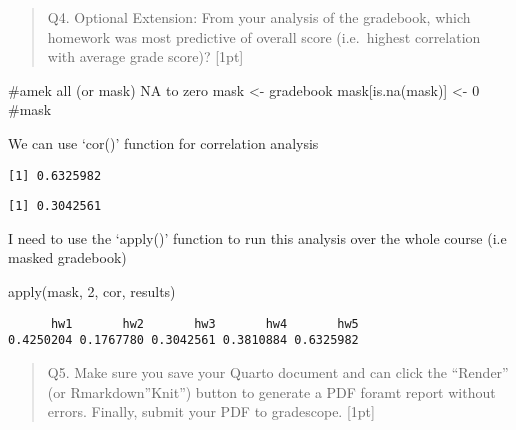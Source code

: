 \documentclass[
  letterpaper,
  DIV=11,
  numbers=noendperiod]{scrartcl}
\newenvironment{Shaded}{\begin{snugshade}}{\end{snugshade}}
\newcommand{\CommentTok}[1]{\textcolor[rgb]{0.37,0.37,0.37}{#1}}
\newcommand{\DecValTok}[1]{\textcolor[rgb]{0.68,0.00,0.00}{#1}}
\newcommand{\FunctionTok}[1]{\textcolor[rgb]{0.28,0.35,0.67}{#1}}
\newcommand{\NormalTok}[1]{\textcolor[rgb]{0.00,0.23,0.31}{#1}}
\newcommand{\OtherTok}[1]{\textcolor[rgb]{0.00,0.23,0.31}{#1}}
\newcommand{\SpecialCharTok}[1]{\textcolor[rgb]{0.37,0.37,0.37}{#1}}
\begin{document}
\begin{quote}
Q4. Optional Extension: From your analysis of the gradebook, which
homework was most predictive of overall score (i.e.~highest correlation
with average grade score)? {[}1pt{]}
\end{quote}

\begin{Shaded}
\begin{Highlighting}[]
\CommentTok{\#amek all (or mask) NA to zero}
\NormalTok{mask }\OtherTok{\textless{}{-}}\NormalTok{ gradebook}
\NormalTok{mask[}\FunctionTok{is.na}\NormalTok{(mask)] }\OtherTok{\textless{}{-}} \DecValTok{0}
\CommentTok{\#mask}
\end{Highlighting}
\end{Shaded}

We can use `cor()' function for correlation analysis

\begin{Shaded}
\end{Shaded}

\begin{verbatim}
[1] 0.6325982
\end{verbatim}

\begin{Shaded}
\end{Shaded}

\begin{verbatim}
[1] 0.3042561
\end{verbatim}

I need to use the `apply()' function to run this analysis over the whole
course (i.e masked gradebook)

\begin{Shaded}
\begin{Highlighting}[]
\FunctionTok{apply}\NormalTok{(mask, }\DecValTok{2}\NormalTok{, cor, results)}
\end{Highlighting}
\end{Shaded}

\begin{verbatim}
      hw1       hw2       hw3       hw4       hw5 
0.4250204 0.1767780 0.3042561 0.3810884 0.6325982 
\end{verbatim}

\begin{quote}
Q5. Make sure you save your Quarto document and can click the ``Render''
(or Rmarkdown''Knit'') button to generate a PDF foramt report without
errors. Finally, submit your PDF to gradescope. {[}1pt{]}
\end{quote}
\end{document}
